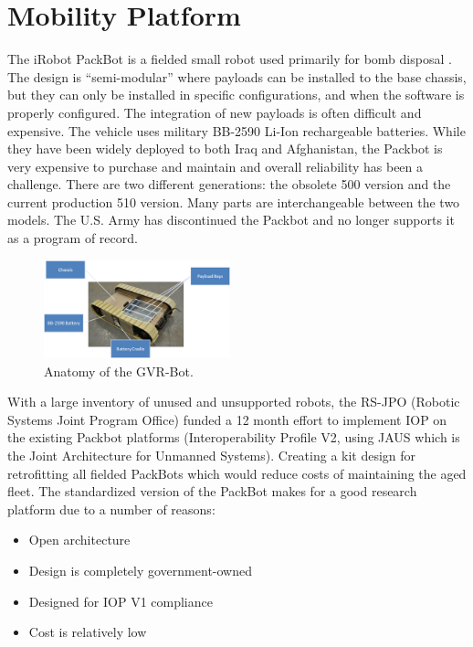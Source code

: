 \section{Mobility Platform}\label{sec:platform}

The iRobot PackBot is a fielded small robot used primarily for bomb disposal \cite{iRobot,Hogg2002}. The design is ``semi-modular'' where payloads can be installed to the base chassis, but they can only be installed in specific configurations, and when the software is properly configured. The integration of new payloads is often difficult and expensive. The vehicle uses military BB-2590 Li-Ion rechargeable batteries. While they have been widely deployed to both Iraq and Afghanistan, the Packbot is very expensive to purchase and maintain and overall reliability has been a challenge. There are two different generations: the obsolete 500 version and the current production 510 version. Many parts are interchangeable between the two models. The U.S. Army has discontinued the Packbot and no longer supports it as a program of record.

\begin{figure}
	\centering
	\includegraphics[width=0.48\textwidth]{./pictures/packbot.png}
	\caption{Anatomy of the GVR-Bot.}
	\label{fig:packbot}
\end{figure}

With a large inventory of unused and unsupported robots, the RS-JPO (Robotic Systems Joint Program Office) funded a 12 month effort to implement IOP on the existing Packbot platforms (Interoperability Profile V2, using JAUS which is the Joint Architecture for Unmanned Systems). Creating a kit design for retrofitting all fielded PackBots which would reduce costs of maintaining the aged fleet. The standardized version of the PackBot makes for a good research platform due to a number of reasons:
\begin{itemize}
	\item Open architecture
	\item Design is completely government-owned
	\item Designed for IOP V1 compliance
	\item Cost is relatively low
\end{itemize}

